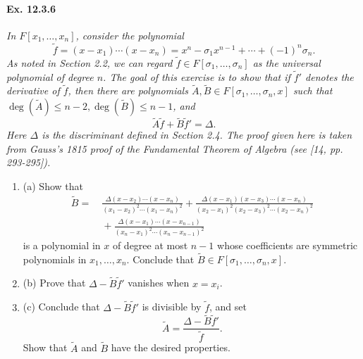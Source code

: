 \documentclass[11pt,a4paper]{article}
\newcommand{\be} {\begin{enumerate}}
\newcommand{\ee} {\end{enumerate}}
\begin{document}
\paragraph{Ex. 12.3.6}

{\it In $F[x_1,\ldots,x_n]$, consider the polynomial
$$\tilde{f} = (x-x_1)\cdots(x-x_n) = x^n -\sigma_1x^{n-1} + \cdots + (-1)^n \sigma_n.$$
As noted in Section 2.2, we can regard $\tilde{f} \in F[\sigma_1,\ldots,\sigma_n]$ as the universal polynomial of degree $n$. The goal of this exercise is to show that if $\tilde{f}'$ denotes the derivative of $\tilde{f}$, then there are polynomials $\tilde{A},\tilde{B} \in F[\sigma_1,\ldots,\sigma_n,x]$ such that $\deg(\tilde{A}) \leq n-2, \deg(\tilde{B}) \leq n-1$, and
$$\tilde{A} \tilde{f} + \tilde{B}\tilde{f}' = \Delta.$$
Here $ \Delta$ is the discriminant defined in Section 2.4. The proof given here is taken from Gauss's 1815 proof of the Fundamental Theorem of Algebra (see [14, pp. 293-295]).
}

\be
\item[(a)] Show that
\begin{align*}
\tilde{B} = &\ \frac{\Delta(x-x_2)\cdots(x-x_n)}{(x_1-x_2)^2\cdots(x_1-x_n)^2} +  \frac{\Delta(x-x_1)(x-x_3)\cdots(x-x_n)}{(x_2-x_1)^2(x_2-x_3)^2\cdots(x_2-x_n)^2}\\
&\ +   \frac{\Delta(x-x_1)\cdots(x-x_{n-1})}{(x_n-x_1)^2\cdots(x_n-x_{n-1})^2}
\end{align*}
is a polynomial in $x$ of degree at most $n-1$ whose coefficients are symmetric polynomials in $x_1,\ldots,x_n$. Conclude that $\tilde{B} \in F[\sigma_1,\ldots,\sigma_n,x]$.

\item[(b)] Prove that $\Delta - \tilde{B} \tilde{f}'$ vanishes when $x=x_i$.

\item[(c)] Conclude that $\Delta - \tilde{B} \tilde{f}'$ is divisible by $\tilde{f}$, and set
$$\tilde{A} = \frac{\Delta - \tilde{B} \tilde{f}'}{\tilde{f}}.$$
Show that $\tilde{A}$ and $\tilde{B}$ have the desired properties.
\ee
\end{document}
